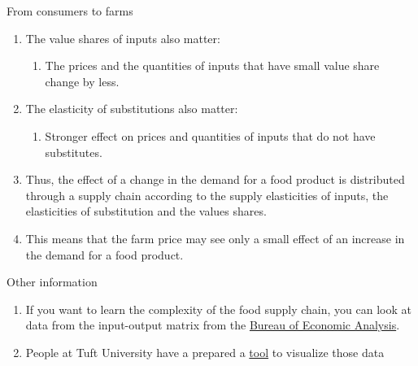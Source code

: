 \documentclass[table,xcolor=pdftex,dvipsnames, handout]{beamer}\usepackage[]{graphicx}\usepackage[]{color}
\begin{document}

\begin{frame}{From consumers to farms}
\begin{enumerate}[label=\textbullet]
  \item The value shares of inputs also matter:
        \begin{enumerate}[label=-]
          \item The prices and the quantities of inputs that have small value share change by less.
        \end{enumerate}
  \item The elasticity of substitutions also matter:
        \begin{enumerate}[label=-]
          \item Stronger effect on prices and quantities of inputs that do not have substitutes.
        \end{enumerate}
  \item Thus, the effect of a change in the demand for a food product is distributed through a supply chain according to the supply elasticities of inputs, the elasticities of substitution and the values shares.
  \item This means that the farm price may see only a small effect of an increase in the demand for a food product.
\end{enumerate}
\end{frame}


\begin{frame}{Other information}
\begin{enumerate}[label=\textbullet]
  \item If you want to learn the complexity of the food supply chain, you can look at data from the input-output matrix from the \href{http://www.bea.gov/newsreleases/industry/io/2013/io1213.htm}{Bureau of Economic Analysis}.
  \item People at Tuft University have a prepared a \href{http://usfoodpolicy.blogspot.com/search/label/visualization}{tool} to visualize those data
\end{enumerate}
\end{frame}



%
%


\end{document}
